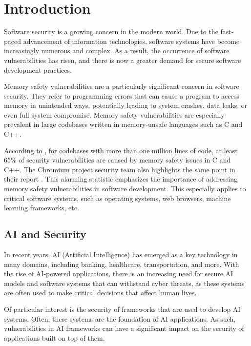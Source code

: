 \section{Introduction}

Software security is a growing concern in the modern world. Due to the fast-paced advancement of information technologies, software systems have become increasingly numerous and complex. As a result, the occurrence of software vulnerabilities has risen, and there is now a greater demand for secure software development practices.

Memory safety vulnerabilities are a particularly significant concern in software security. They refer to programming errors that can cause a program to access memory in unintended ways, potentially leading to system crashes, data leaks, or even full system compromise. Memory safety vulnerabilities are especially prevalent in large codebases written in memory-unsafe languages such as C and C++.

According to \cite{what-science-can-tell-us-about-c-and-c++-security}, for codebases with more than one million lines of code, at least 65\% of security vulnerabilities are caused by memory safety issues in C and C++. The Chromium project security team also highlights the same point in their report \cite{chromium-project-memory-safety}. This alarming statistic emphasizes the importance of addressing memory safety vulnerabilities in software development. This especially applies to critical software systems, such as operating systems, web browsers, machine learning frameworks, etc.

\subsection{AI and Security}


In recent years, AI (Artificial Intelligence) has emerged as a key technology in many domains, including banking, healthcare, transportation, and more. With the rise of AI-powered applications, there is an increasing need for secure AI models and software systems that can withstand cyber threats, as these systems are often used to make critical decisions that affect human lives.

Of particular interest is the security of frameworks that are used to develop AI systems. Often, these systems are the foundation of AI applications. As such, vulnerabilities in AI frameworks can have a significant impact on the security of applications built on top of them.

